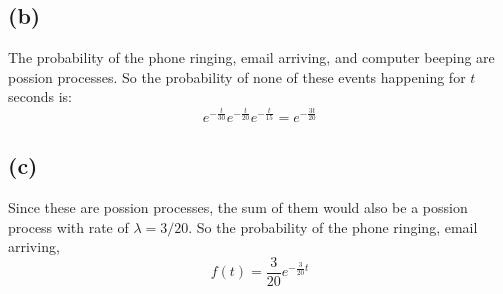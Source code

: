 \subsection*{(b)}
The probability of the phone ringing, email arriving, and computer beeping
are possion processes. So the probability of none of these events happening for 
$t$ seconds is:
$$e^{-\frac{t}{30}}e^{-\frac{t}{20}}e^{-\frac{t}{15}}=\boxed{e^{-\frac{3t}{20}}}$$
\subsection*{(c)}
Since these are possion processes, the sum of them would also be a possion process
with rate of $\lambda=3/20$. So the probability of the phone ringing, email arriving,
$$\boxed{f(t)=\frac{3}{20}e^{-\frac{3}{20}t}}$$

